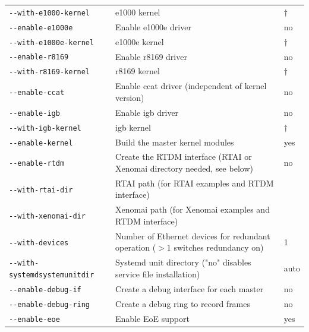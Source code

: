 \documentclass[a4paper,12pt,BCOR6mm,bibtotoc,idxtotoc]{scrbook}
\begin{document}
\begin{longtable}{l|p{}|l}
\lstinline+--with-e1000-kernel+ & e1000 kernel & $\dagger$\\

\lstinline+--enable-e1000e+ & Enable e1000e driver & no\\

\lstinline+--with-e1000e-kernel+ & e1000e kernel & $\dagger$\\

\lstinline+--enable-r8169+ & Enable r8169 driver & no\\

\lstinline+--with-r8169-kernel+ & r8169 kernel & $\dagger$\\

\lstinline+--enable-ccat+ & Enable ccat driver (independent of kernel version)
& no\\

\lstinline+--enable-igb+ & Enable igb driver & no\\

\lstinline+--with-igb-kernel+ & igb kernel & $\dagger$\\

\hline

\lstinline+--enable-kernel+ & Build the master kernel modules & yes\\

\lstinline+--enable-rtdm+ & Create the RTDM interface (RTAI or Xenomai
directory needed, see below) & no\\

\lstinline+--with-rtai-dir+ & RTAI path (for RTAI examples and RTDM interface)
& \\

\lstinline+--with-xenomai-dir+ & Xenomai path (for Xenomai examples and RTDM
interface) & \\

\lstinline+--with-devices+ & Number of Ethernet devices for redundant
operation ($>1$ switches redundancy on) & 1\\

\lstinline+--with-systemdsystemunitdir+ & Systemd unit directory ("no"
disables service file installation)
& auto \\

\lstinline+--enable-debug-if+ & Create a debug interface for each master & no\\

\lstinline+--enable-debug-ring+ & Create a debug ring to record frames & no\\

\lstinline+--enable-eoe+ & Enable EoE support & yes\\


\end{longtable}
\end{document}
